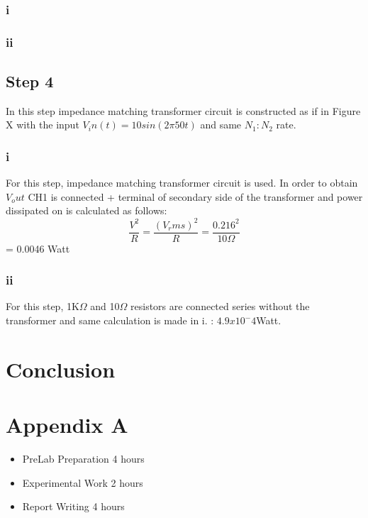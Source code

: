 \documentclass[letterpaper,12pt]{article}
\begin{document}
\subsubsection{i}
\subsubsection{ii}

%
\subsection{Step 4}
In this step impedance matching transformer circuit is constructed as if in Figure X with the input \(V_in(t) = 10sin(2\pi50t)\) and same \(N_1:N_2\) rate. 

\subsubsection{i}
For this step, impedance matching transformer circuit is used. In order to obtain \(V_out\) CH1 is connected + terminal of secondary side of the transformer and power dissipated on is calculated as follows:
\[\frac{V^2}{R} = \frac{(V_rms)^2}{R} = \frac{0.216^2}{10\Omega }\] = 0.0046 Watt  

\subsubsection{ii}
For this step, 1K\(\Omega \) and 10\(\Omega \) resistors are connected series without the transformer and same calculation is made in i. :
 \(4.9 x 10^-4\)Watt.


\section{Conclusion}

\section*{Appendix A}
\begin{itemize}
    \item PreLab Preparation 4 hours
    \item Experimental Work 2  hours
    \item Report Writing 4 hours
\end{itemize}
\end{document}
